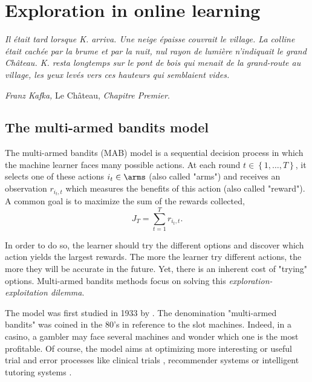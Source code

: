 \chapter{Exploration in online learning}
\vspace{-2.5cm}
{\emph{Il était tard lorsque K. arriva. Une neige épaisse couvrait le village. La colline était cachée par la brume et par la nuit, nul
rayon de lumière n’indiquait le grand Château. K. resta longtemps sur le pont de bois qui menait de la grand-route au village, les yeux levés vers ces hauteurs qui semblaient vides.} \\ \vspace{-1.2cm}
\begin{flushright}
\emph{Franz Kafka,} Le Château, \emph{Chapitre Premier}.
\end{flushright}

\label{ch:exploration}
\section{The multi-armed bandits model}

The multi-armed bandits (MAB) model is a sequential decision process in which the machine learner faces many possible actions. At each round $t \in \left\{ 1, \dots, T\right\}$, it selects one of these actions $i_t \in \arms$ (also called "arms") and receives an observation  $r_{i_t, t}$ which measures the benefits of this action (also called "reward"). A common goal is to maximize the sum of the rewards collected,
\[
J_T = \sum_{t=1}^T r_{i_t,t}.
\]

In order to do so, the learner should try the different options and discover which action yields the largest rewards. The more the learner try different actions, the more they will be accurate in the future. Yet, there is an inherent cost of "trying" options. Multi-armed bandits methods focus on solving this \textit{exploration-exploitation dilemma}. 

The model was first studied in 1933 by \citet{thompson1933likelihood}. The denomination "multi-armed bandits" was coined in the 80's in reference to the slot machines. Indeed, in a casino, a gambler may face several machines and wonder which one is the most profitable. Of course, the model aims at optimizing more interesting or useful trial and error processes like clinical trials \citep{villar2015bandit}, recommender systems \citep{traca2015regulating} or intelligent tutoring systems \citep{clement2015multi, pikeburke2019phd}.

}
